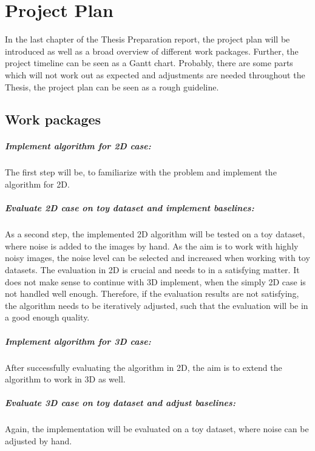 \chapter{Project Plan}
\label{sec:projectPlan}
In the last chapter of the Thesis Preparation report, the project plan will be introduced as well as a broad overview of different 
work packages. Further, the project timeline can be seen as a Gantt chart.
Probably, there are some parts which will not work out as expected and 
adjustments are needed throughout the Thesis, the project plan can be seen as a rough guideline.

\section{Work packages}


\paragraph{Implement algorithm for 2D case:}
The first step will be, to familiarize with the problem and implement
the algorithm for 2D. 

\paragraph{Evaluate 2D case on toy dataset and implement baselines:}
As a second step, the implemented 2D algorithm will be tested on a toy dataset,
where noise is added to the images by hand. As the aim is to work with highly noisy images,
the noise level can be selected and increased when working with toy datasets. 
The evaluation in 2D is crucial and needs to in a satisfying matter. 
It does not make sense to continue with 3D implement, when the simply 2D case is not handled well enough.
Therefore, if the evaluation results are not satisfying, the algorithm needs to be iteratively adjusted, 
such that the evaluation will be in a good enough quality.


\paragraph{Implement algorithm for 3D case:}
After successfully evaluating the algorithm in 2D, the aim is to extend the algorithm to work in 3D as well.

\paragraph{Evaluate 3D case on toy dataset and adjust baselines:}
Again, the implementation will be evaluated on a toy dataset, where noise can be adjusted by hand.


